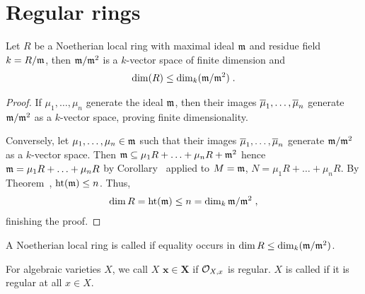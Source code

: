 \documentclass[a4paper,parskip=half,numbers=enddot, DIV=12]{scrreprt}
\begin{document}
\section{Regular rings}
\begin{prop}
    Let $R$ be a Noetherian local ring with maximal ideal $\mathfrak{m}$ and residue field $k=R/\mathfrak{m}$, then $\mathfrak{m}/\mathfrak{m}^2$ is a $k$-vector space of finite dimension and 
    \begin{align*}
    	\dim(R) \leq \dim_k(\mathfrak{m}/\mathfrak{m}^2)\;.
    \end{align*}
\end{prop}
\begin{proof}
    If $\mu_1,\ldots,\mu_n$ generate the ideal $\mathfrak{m}$, then their images $\overline{\mu}_1,\ldots,\overline{\mu}_n$ generate $\mathfrak{m}/\mathfrak{m}^2$ as a $k$-vector space, proving finite dimensionality. 
    
    Conversely, let $\mu_1,\ldots,\mu_n\in\mathfrak{m}$ such that their images $\overline{\mu}_1,\ldots,\overline{\mu}_n$ generate $\mathfrak{m}/\mathfrak{m}^2$ as a $k$-vector space. Then $\mathfrak{m} \subseteq \mu_1R+\ldots+\mu_nR+\mathfrak{m}^2$ hence $\mathfrak{m} = \mu_1R+\ldots+\mu_nR$ by Corollary~ applied to $M = \mathfrak{m}$, $N = \mu_1R+\ldots+\mu_nR$. By Theorem~, $\operatorname{ht}(\mathfrak{m}) \leq n$. Thus,
    \begin{align*}
    	\dim R = \operatorname{ht}(\mathfrak{m}) \leq n = \dim_k \mathfrak{m}/\mathfrak{m}^2\;,
    \end{align*}
    finishing the proof.
\end{proof}
\begin{defi}[regularity]
	\begin{alphanumerate}
		\item A Noetherian local ring is called  if equality occurs in $\dim R \leq\dim_k(\mathfrak{m}/\mathfrak{m}^2)$. 
		\item For algebraic varieties $X$, we call $X$  $\boldsymbol{x\in X}$ if $\mathcal{O}_{X,x}$ is regular. $X$ is called  if it is regular at all $x\in X$.
	\end{alphanumerate}
\end{defi}
\end{document}
